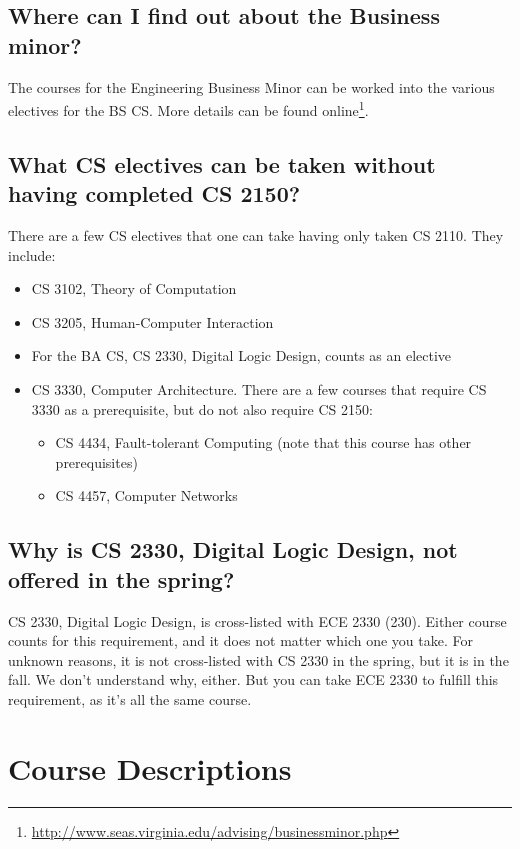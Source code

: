 \documentclass[10pt,letter]{book}
\newenvironment{itemlist}{
\begin{itemize}
\setlength{\itemsep}{0pt}
\setlength{\parskip}{0pt}}
{\end{itemize}}
\newcommand{\mysection}[1]{\section{#1}\renewcommand{\rightmark}{#1}}
\newcommand{\myurl}[1]{\footnote{\scriptsize\url{#1}}}
\begin{document}
\subsection{Where can I find out about the Business minor?}

The courses for the Engineering Business Minor can be worked into the
various electives for the BS CS. More details can be found
online\myurl{http://www.seas.virginia.edu/advising/businessminor.php}.


\subsection{What CS electives can be taken without having completed CS
  2150?}

There are a few CS electives that one can take having only taken CS
2110.  They include:
\begin{itemlist}
\item CS 3102, Theory of Computation
\item CS 3205, Human-Computer Interaction
\item For the BA CS, CS 2330, Digital Logic Design, counts as an
  elective
\item CS 3330, Computer Architecture.  There are a
  few courses that require CS 3330 as a prerequisite, but do not also
  require CS 2150:
  \begin{itemlist}
  \item CS 4434, Fault-tolerant Computing (note that this course
    has other prerequisites)
  \item CS 4457, Computer Networks
  \end{itemlist}
\end{itemlist}

\subsection{Why is CS 2330, Digital Logic Design, not offered
  in the spring?}
\label{cs2330}

CS 2330, Digital Logic Design, is cross-listed with ECE 2330
(230).  Either course counts for this requirement, and it does not
matter which one you take.  For unknown reasons, it is not
cross-listed with CS 2330 in the spring, but it is in the fall.
We don't understand why, either.  But you can take ECE 2330 to
fulfill this requirement, as it's all the same course.



\clearpage
\mysection{Course Descriptions}
\label{sec:coursedesc}
\end{document}
